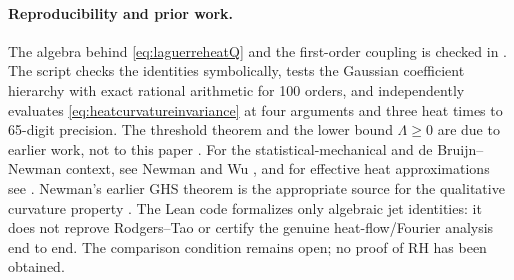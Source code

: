 





\paragraph{Reproducibility and prior work.}
The algebra behind
\eqref{eq:laguerreheatQ} and
the first-order coupling is checked in
.
The script
checks the identities symbolically, tests
the Gaussian coefficient hierarchy with
exact rational arithmetic for 100 orders,
and independently evaluates
\eqref{eq:heatcurvatureinvariance}
at four arguments and three heat times
to 65-digit precision.
The threshold theorem and the lower bound
$\Lambda\ge0$ are due to earlier work,
not to this paper \cite{RodgersTao}.
For the statistical-mechanical and
de Bruijn--Newman context, see Newman
and Wu \cite{NewmanWu}, and for effective
heat approximations see \cite{Polymath15}.
Newman's earlier GHS theorem is the
appropriate source for the qualitative
curvature property \cite{NewmanGHS}.
The Lean code formalizes only algebraic
jet identities: it does not reprove
Rodgers--Tao or certify the genuine
heat-flow/Fourier analysis end to end.
The comparison condition remains open;
no proof of RH has been obtained.
